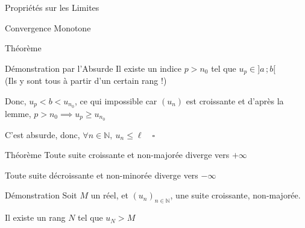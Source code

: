 \documentclass{cours}
\begin{document}
\begin{Gpartie}{Propriétés sur les Limites}
\begin{Spartie}{Convergence Monotone}
\begin{SSpartie}{Théorème}
\begin{SSSpartie}{Démonstration par l'Absurde}
                    Il existe un indice $p>n_0$ tel que $u_p\in\big]a\,;b\big[$ \\ (Ils y sont tous à partir d'un certain rang !)

                    Donc, $u_p<b<u_{n_0}$, ce qui impossible car $(u_n)$ est croissante et d'après la lemme, $p>n_0\implies u_p\geq u_{n_0}$

                    C'est absurde, donc, $\forall n\in\mathbb{N},~u_n\leq\ell\quad\square$
                \end{SSSpartie}
            \end{SSpartie}
            \pagebreak
            \begin{SSpartie}{Théorème} 
                Toute suite croissante et non-majorée diverge vers $+\infty$

                Toute suite décroissante et non-minorée diverge vers $-\infty$

                \begin{SSSpartie}{Démonstration} 
                    Soit $M$ un réel, et $(u_n)_{n\in\mathbb{N}}$, une suite croissante, non-majorée.

                    Il existe un rang $N$ tel que $u_N>M$


\end{SSSpartie}
\end{SSpartie}
\end{Spartie}
\end{Gpartie}
\end{document}

